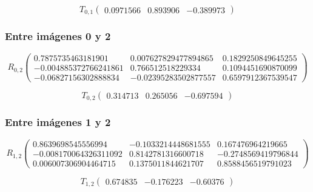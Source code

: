 \documentclass[a4paper, 11pt]{article}
\theoremstyle{definition}
\theoremstyle{theorem}
\begin{document}
    \[
    T_{0,1}\left(
    \begin{array}{ccc}
        0.0971566 &  0.893906 & -0.389973
    \end{array}
    \right)
    \]

    \subsubsection*{Entre imágenes 0 y 2}

    \[
    R_{0,2}\left(
    \begin{array}{ccc}
        0.7875735463181901 & 0.007627829477894865 & 0.1829250849645255 \\
        -0.004885372766241861 & 0.766512518229334 & 0.1094451690870099 \\
        -0.06827156302888834 & -0.02395283502877557 & 0.6597912367539547
    \end{array}
    \right)
    \]

    \[
    T_{0,2}\left(
    \begin{array}{ccc}
        0.314713 &  0.265056 & -0.697594
    \end{array}
    \right)
    \]

    \subsubsection*{Entre imágenes 1 y 2}

    \[
    R_{1,2}\left(
    \begin{array}{ccc}
        0.8639698545556994 & -0.1033214448681555 & 0.167476964219665 \\
        -0.008170064326311092 & 0.8142781316600718 & -0.2748569419796844 \\
        0.006007306904464715 & 0.1375011844621707 & 0.8588456519791023
    \end{array}
    \right)
    \]

    \[
    T_{1,2}\left(
    \begin{array}{ccc}
        0.674835  & -0.176223 & -0.60376
    \end{array}
    \right)
    \]
\end{document}
